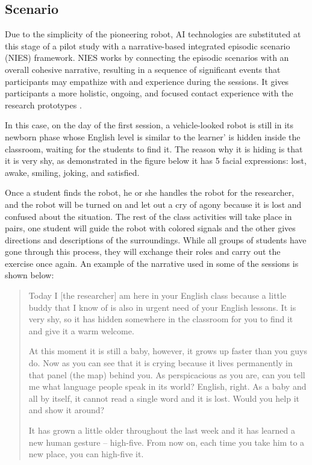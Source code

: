 \documentclass[english]{textolivre}
\begin{document}
\subsection{Scenario}\label{sec-organizacao}
Due to the simplicity of the pioneering robot, AI technologies are substituted at this stage of a pilot study with a narrative-based integrated episodic scenario (NIES) framework. NIES works by connecting the episodic scenarios with an overall cohesive narrative, resulting in a sequence of significant events that participants may empathize with and experience during the sessions. It gives participants a more holistic, ongoing, and focused contact experience with the research prototypes \cite{koay_prototyping_2016}.

In this case, on the day of the first session, a vehicle-looked robot is still in its newborn phase whose English level is similar to the learner’ is hidden inside the classroom, waiting for the students to find it. The reason why it is hiding is that it is very shy, as demonstrated in the figure below it has 5 facial expressions: lost, awake, smiling, joking, and satisfied.

Once a student finds the robot, he or she handles the robot for the researcher, and the robot will be turned on and let out a cry of agony because it is lost and confused about the situation. The rest of the class activities will take place in pairs, one student will guide the robot with colored signals and the other gives directions and descriptions of the surroundings. While all groups of students have gone through this process, they will exchange their roles and carry out the exercise once again. An example of the narrative used in some of the sessions is shown below:

\begin{quote}
    Today I [the researcher] am here in your English class because a little buddy that I know of is also in urgent need of your English lessons. It is very shy, so it has hidden somewhere in the classroom for you to find it and give it a warm welcome.
    
    At this moment it is still a baby, however, it grows up faster than you guys do. Now as you can see that it is crying because it lives permanently in that panel (the map) behind you. As perspicacious as you are, can you tell me what language people speak in its world?  English, right. As a baby and all by itself, it cannot read a single word and it is lost. Would you help it and show it around?
    
    It has grown a little older throughout the last week and it has learned a new human gesture – high-five. From now on, each time you take him to a new place, you can high-five it.
\end{quote}
\end{document}
